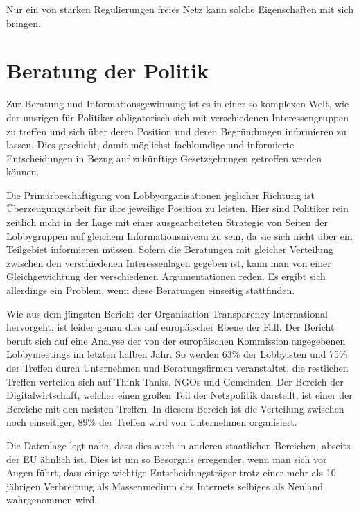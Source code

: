 \documentclass[
	12pt,
	a4paper,
	BCOR10mm,
	DIV14,
	listof=totoc,
	bibliography=totoc,
	headsepline
]{scrreprt}
\begin{document}
Nur ein von starken Regulierungen freies Netz kann solche Eigenschaften mit sich bringen.



\section{Beratung der Politik}
\label{lobby}
Zur Beratung und Informationsgewinnung ist es in einer so komplexen Welt, wie der unsrigen für Politiker obligatorisch sich mit verschiedenen Interessengruppen zu treffen und sich über deren Position und deren Begründungen informieren zu lassen.
Dies geschieht, damit möglichst fachkundige und informierte Entscheidungen in Bezug auf zukünftige Gesetzgebungen getroffen werden können. 

Die Primärbeschäftigung von Lobbyorganisationen jeglicher Richtung ist Überzeugungsarbeit für ihre jeweilige Position zu leisten.
Hier sind Politiker rein zeitlich nicht in der Lage mit einer ausgearbeiteten Strategie von Seiten der Lobbygruppen auf gleichem Informationsniveau zu sein, da sie sich nicht über ein Teilgebiet informieren müssen.
Sofern die Beratungen mit gleicher Verteilung zwischen den verschiedenen Interessenlagen gegeben ist, kann man von einer Gleichgewichtung der verschiedenen Argumentationen reden.
Es ergibt sich allerdings ein Problem, wenn diese Beratungen einseitig stattfinden. 

Wie aus dem jüngsten Bericht der Organisation Transparency International \cite{lobby} hervorgeht, ist leider genau dies auf europäischer Ebene der Fall.
Der Bericht beruft sich auf eine Analyse der von der europäischen Kommission angegebenen Lobbymeetings im letzten halben Jahr.
So werden 63\% der Lobbyisten und 75\% der Treffen durch Unternehmen und Beratungsfirmen veranstaltet, die restlichen Treffen verteilen sich auf Think Tanks, NGOs und Gemeinden.
Der Bereich der Digitalwirtschaft, welcher einen großen Teil der Netzpolitik darstellt, ist einer der Bereiche mit den meisten Treffen.
In diesem Bereich ist die Verteilung zwischen noch einseitiger, 89\% der Treffen wird von Unternehmen organisiert. 

Die Datenlage legt nahe, dass dies auch in anderen staatlichen Bereichen, abseits der EU ähnlich ist. 
Dies ist um so Besorgnis erregender, wenn man sich vor Augen führt, dass einige wichtige Entscheidungsträger trotz einer mehr als 10 jährigen Verbreitung als Massenmedium des Internets selbiges als Neuland wahrgenommen wird. \cite{internetneuland}
\end{document}
